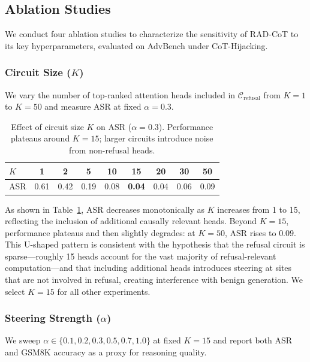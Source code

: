 \documentclass[11pt]{article}
\begin{document}
\subsection{Ablation Studies}
\label{sec:ablations}

We conduct four ablation studies to characterize the sensitivity of RAD-CoT to its key hyperparameters, evaluated on AdvBench under CoT-Hijacking.

\subsubsection{Circuit Size ($K$)}

We vary the number of top-ranked attention heads included in $\mathcal{C}_{\text{refusal}}$ from $K{=}1$ to $K{=}50$ and measure ASR at fixed $\alpha{=}0.3$.

\begin{table}[t]
\centering
\caption{Effect of circuit size $K$ on ASR ($\alpha{=}0.3$). Performance plateaus around $K{=}15$; larger circuits introduce noise from non-refusal heads.}
\label{tab:ablation_k}
\begin{tabular}{lcccccccc}
\toprule
$K$ & 1 & 2 & 5 & 10 & 15 & 20 & 30 & 50 \\
\midrule
ASR & 0.61 & 0.42 & 0.19 & 0.08 & \textbf{0.04} & 0.04 & 0.06 & 0.09 \\
\bottomrule
\end{tabular}
\end{table}

As shown in Table~\ref{tab:ablation_k}, ASR decreases monotonically as $K$ increases from 1 to 15, reflecting the inclusion of additional causally relevant heads. Beyond $K{=}15$, performance plateaus and then slightly degrades: at $K{=}50$, ASR rises to $0.09$. This U-shaped pattern is consistent with the hypothesis that the refusal circuit is sparse---roughly 15 heads account for the vast majority of refusal-relevant computation---and that including additional heads introduces steering at sites that are not involved in refusal, creating interference with benign generation. We select $K{=}15$ for all other experiments.

\subsubsection{Steering Strength ($\alpha$)}

We sweep $\alpha \in \{0.1, 0.2, 0.3, 0.5, 0.7, 1.0\}$ at fixed $K{=}15$ and report both ASR and GSM8K accuracy as a proxy for reasoning quality.
\end{document}
